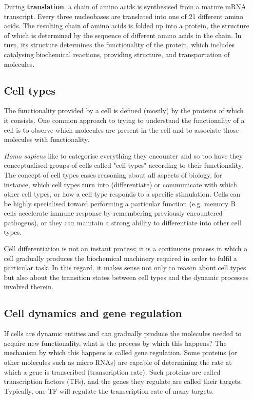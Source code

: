During \textbf{translation}, a chain of amino acids is synthesised from a mature mRNA transcript. 
Every three nucleobases are translated into one of 21 different amino acids. The resulting chain of amino acids is folded up into a protein, the structure of which is determined by the sequence of different amino acids in the chain. In turn, its structure determines the functionality of the protein, which includes catalysing biochemical reactions, providing structure, and transportation of molecules. 

\subsection{Cell types}
The functionality provided by a cell is defined (mostly) by the proteins of which it consists. One common approach to trying to understand the functionality of a cell is to observe which molecules are present in the cell and to associate those molecules with functionality. 

\textit{Homo sapiens} like to categorise everything they encounter and so too have they conceptualised groups of cells called "cell types" according to their functionality. The concept of cell types eases reasoning about all aspects of biology, for instance, which cell types turn into (differentiate) or communicate with which other cell types, or how a cell type responds to a specific stimulation. Cells can be highly specialised toward performing a particular function (e.g. memory B cells accelerate immune response by remembering previously encountered pathogens), or they can maintain a strong ability to differentiate into other cell types. 

Cell differentiation is not an instant process; it is a continuous process in which a cell gradually produces the biochemical machinery required in order to fulfil a particular task. In this regard, it makes sense not only to reason about cell types but also about the transition states between cell types and the dynamic processes involved therein.


\subsection{Cell dynamics and gene regulation}
If cells are dynamic entities and can gradually produce the molecules needed to acquire new functionality, what is the process by which this happens? The mechanism by which this happens is called gene regulation. Some proteins (or other molecules such as micro RNAs) are capable of determining the rate at which a gene is transcribed (transcription rate). Such proteins are called transcription factors (TFs), and the genes they regulate are called their targets. Typically, one TF will regulate the transcription rate of many targets.

